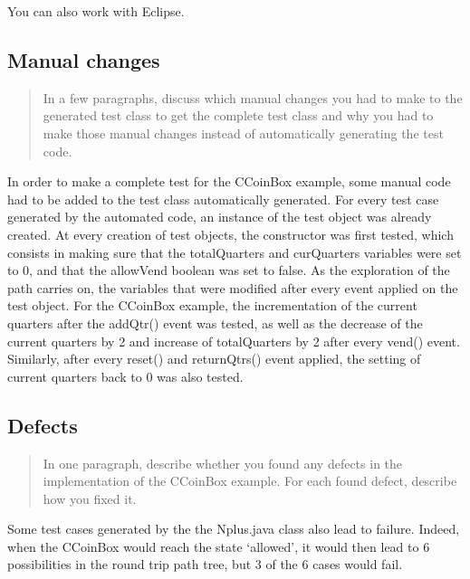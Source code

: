 \documentclass[ieee]{submit}
\begin{document}
You can also work with Eclipse.

\subsection{Manual changes}

\begin{quote}
In a few paragraphs, discuss which manual changes you had to make to the generated test class to get the complete test class and why you had to make those manual changes instead of automatically generating the test code.
\end{quote}

In order to make a complete test for the CCoinBox example, some manual code had to be added to the test class automatically generated. For every test case generated by the automated code, an instance of the test object was already created. At every creation of test objects, the constructor was first tested, which consists in making sure that the totalQuarters and curQuarters variables were set to 0, and that the allowVend boolean was set to false. 
As the exploration of the path carries on, the variables that were modified after every event applied on the test object. For the CCoinBox example, the incrementation of the current quarters after the addQtr() event was tested, as well as the decrease of the current quarters by 2 and increase of totalQuarters by 2 after every vend() event. Similarly, after every reset() and returnQtrs() event applied, the setting of current quarters back to 0 was also tested.

\subsection{Defects}

\begin{quote}
In one paragraph, describe whether you found any defects in the implementation of the CCoinBox example. For each found defect, describe how you fixed it.
\end{quote}

Some test cases generated by the the Nplus.java class also lead to failure. Indeed, when the CCoinBox would reach the state ‘allowed’, it would then lead to 6 possibilities in the round trip path tree, but 3 of the 6 cases would fail. 
\end{document}
